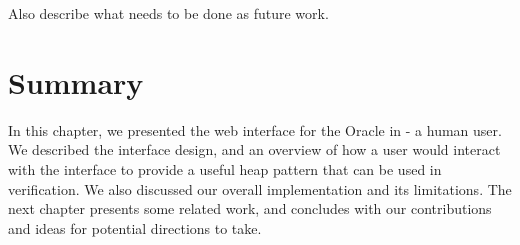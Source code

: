 Also describe what needs to be done as future work.

\section*{Summary}
In this chapter, we presented the web interface for the Oracle in \verifier - a human
user. We described the interface design, and an overview of how a user would interact
with the interface to provide a useful heap pattern that can be used in verification. We
also discussed our overall implementation and its limitations. The next chapter presents
some related work, and concludes with  our contributions and ideas for potential
directions to take.
